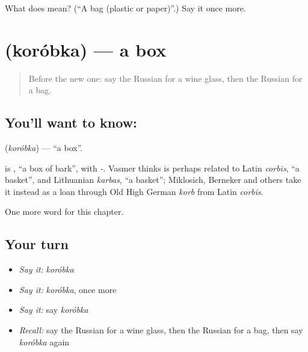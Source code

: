 \begin{tcolorbox}[breakable,colback=teal!4,colframe=teal!35!black,title={Before you move on}]
What does  mean? (\textquotedblleft{}A bag (plastic or paper)\textquotedblright{}.) Say it once more.
\end{tcolorbox}
\section[\texorpdfstring{\ru{коробка} (koróbka)}{коробка (koróbka)}]{ (koróbka) — a box}

\label{lesson:RU-C160-korobka}



\begin{quote}
Before the new one: say the Russian for a wine glass, then the Russian for a bag.
\end{quote}

\subsection*{You'll want to know: }
\textbf{} (\emph{koróbka}) — \textquotedblleft{}a box\textquotedblright{}.

\begin{cousinweb}
\textbf{} is \emph{}, \textquotedblleft{}a box of bark\textquotedblright{}, with \emph{-}. Vasmer thinks \emph{} is perhaps related to Latin \emph{corbis}, \textquotedblleft{}a basket\textquotedblright{}, and Lithuanian \emph{karbas}, \textquotedblleft{}a basket\textquotedblright{}; Miklosich, Berneker and others take it instead as a loan through Old High German \emph{korb} from Latin \emph{corbis}.
\end{cousinweb}

\begin{grammarlens}[title={What you've built}]
One more word for this chapter.
\end{grammarlens}

\subsection*{Your turn}
\begin{itemize}
\raggedright
  \item \emph{Say it:} \emph{koróbka}
  \item \emph{Say it:} \emph{koróbka}, once more
  \item \emph{Say it:} say \emph{koróbka}
  \item \emph{Recall:} say the Russian for a wine glass, then the Russian for a bag, then say \emph{koróbka} again
\end{itemize}

